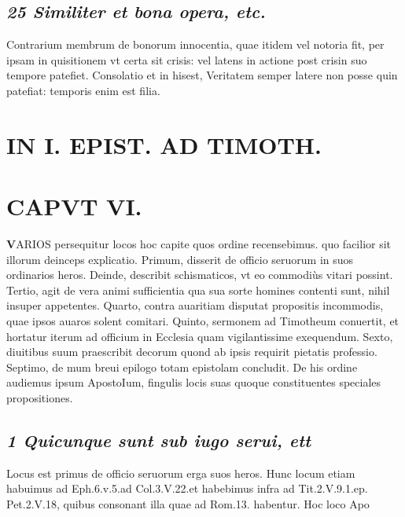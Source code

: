 \documentclass{article}
\begin{document}
\begin{pages}
\subsection*{\textit{25 Similiter et bona opera, etc. }}\pstart Contrarium membrum de bonorum innocentia, quae itidem vel notoria fit, per ipsam in quisitionem vt certa sit crisis: vel latens in actione post crisin suo tempore patefiet. Consolatio et in hisest, Veritatem semper latere non posse quin patefiat: temporis enim est filia.  \pend
\section*{IN I. EPIST. AD TIMOTH. }
\marginpar{[ p.143 ]}
\endnumbering\beginnumbering\section{CAPVT VI.}\pstart \huge\textbf{V}\normalsize ARIOS persequitur locos hoc capite quos ordine recensebimus. quo facilior sit illorum deinceps explicatio. Primum, disserit de officio seruorum in suos ordinarios heros. Deinde, describit schismaticos, vt eo commodiùs vitari possint. Tertio, agit de vera animi sufficientia qua sua sorte homines contenti sunt, nihil insuper appetentes. Quarto, contra auaritiam disputat propositis incommodis, quae ipsos auaros solent comitari. Quinto, sermonem ad Timotheum conuertit, et hortatur iterum ad officium in Ecclesia quam vigilantissime exequendum. Sexto, diuitibus suum praescribit decorum quond ab ipsis requirit pietatis professio. Septimo, de mum breui epilogo totam epistolam concludit. De his ordine audiemus ipsum ApostoIum, fingulis locis suas quoque constituentes speciales propositiones.  \pend
{}
{}
\subsection*{\textit{1 Quicunque sunt sub iugo serui, ett }}\pstart Locus est primus de officio seruorum erga suos heros. Hunc locum etiam habuimus ad Eph.6.v.5.ad Col.3.V.22.et habebimus infra ad Tit.2.V.9.1.ep. Pet.2.V.18, quibus consonant illa quae ad Rom.13. habentur. Hoc loco Apo\pend

\end{pages}
\end{document}
